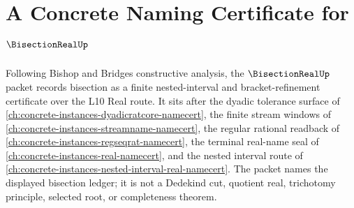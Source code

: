 \chapter{A Concrete Naming Certificate for $\BisectionRealUp$}
\label{ch:concrete-instances-bisection-real-namecert}

Following Bishop and Bridges constructive analysis, the $\BisectionRealUp$ packet records bisection as a finite nested-interval and bracket-refinement certificate over the L10 Real route. It sits after the dyadic tolerance surface of \autoref{ch:concrete-instances-dyadicratcore-namecert}, the finite stream windows of \autoref{ch:concrete-instances-streamname-namecert}, the regular rational readback of \autoref{ch:concrete-instances-regseqrat-namecert}, the terminal real-name seal of \autoref{ch:concrete-instances-real-namecert}, and the nested interval route of \autoref{ch:concrete-instances-nested-interval-real-namecert}. The packet names the displayed bisection ledger; it is not a Dedekind cut, quotient real, trichotomy principle, selected root, or completeness theorem.

